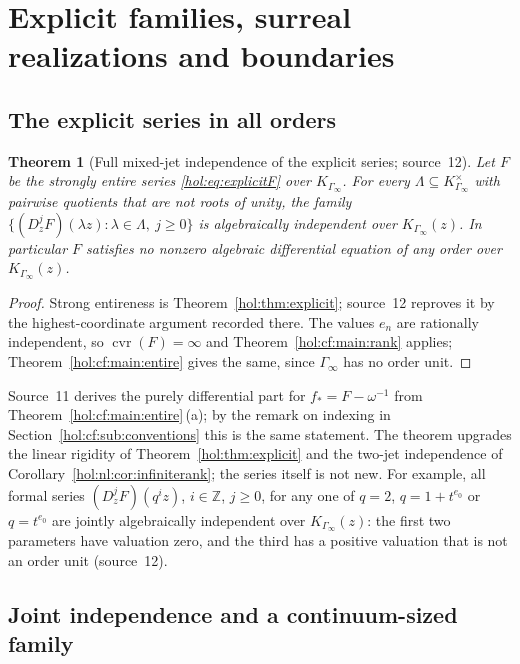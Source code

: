 \documentclass[11pt]{article}
\numberwithin{equation}{section}
\newtheorem{theorem}{Theorem}[section]
\theoremstyle{definition}
\theoremstyle{remark}
\newcommand{\Z}{\mathbb Z}
\newcommand{\cvr}{\operatorname{cvr}}
\begin{document}
\section{Explicit families, surreal realizations and boundaries}
\label{hol:cf:sec:families}

\subsection{The explicit series in all orders}\label{hol:cf:sub:explicit}

\begin{theorem}[Full mixed-jet independence of the explicit series;
source~12]\label{hol:cf:thm:Fomega}
Let $F$ be the strongly entire series \eqref{hol:eq:explicitF} over
$K_{\Gamma_\infty}$. For every $\Lambda\subseteq K_{\Gamma_\infty}^\times$ with
pairwise quotients that are not roots of unity, the family
$\{(D_z^jF)(\lambda z):\lambda\in\Lambda,\ j\ge0\}$ is algebraically independent
over $K_{\Gamma_\infty}(z)$. In particular $F$ satisfies no nonzero algebraic
differential equation of any order over $K_{\Gamma_\infty}(z)$.
\end{theorem}

\begin{proof}
Strong entireness is Theorem~\ref{hol:thm:explicit}; source~12 reproves it by
the highest-coordinate argument recorded there. The values $e_n$ are
rationally independent, so $\cvr(F)=\infty$ and
Theorem~\ref{hol:cf:main:rank} applies; Theorem~\ref{hol:cf:main:entire}
gives the same, since $\Gamma_\infty$ has no order unit.
\end{proof}

Source~11 derives the purely differential part for $f_*=F-\omega^{-1}$ from
Theorem~\ref{hol:cf:main:entire}\,(a); by the remark on indexing in
Section~\ref{hol:cf:sub:conventions} this is the same statement. The theorem
upgrades the linear rigidity of Theorem~\ref{hol:thm:explicit} and the
two-jet independence of Corollary~\ref{hol:nl:cor:infiniterank}; the series
itself is not new. For example, all formal series $(D_z^jF)(q^iz)$, $i\in\Z$, $j\ge0$, for any one of
$q=2$, $q=1+t^{e_0}$ or $q=t^{e_0}$ are jointly algebraically
independent over $K_{\Gamma_\infty}(z)$: the first two parameters have
valuation zero, and the third has a positive valuation that is not an order
unit (source~12).

\subsection{Joint independence and a continuum-sized family}
\label{hol:cf:sub:continuum}
\end{document}
